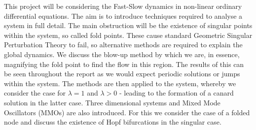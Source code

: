 This project will be considering the Fast-Slow dynamics in non-linear ordinary differential equations. The aim is to introduce techniques required to analyse a system in full detail. The main obstruction will be the existence of singular points within the system, so called fold points. These cause standard Geometric Singular Perturbation Theory to fail, so alternative methods are required to explain the global dynamics. We discuss the blow-up method by which we are, in essence, magnifying the fold point to find the flow in this region. The results of this can be seen throughout the report as we would expect periodic solutions or jumps within the system. The methods are then applied to the \vdp system, whereby we consider the case for $ \lambda=1 $ and $ \lambda>0 $ - leading to the formation of a canard solution in the latter case. Three dimensional systems and Mixed Mode Oscillators (MMOs) are also introduced. For this we consider the case of a folded node and discuss the existence of Hopf bifurcations in the singular case.  